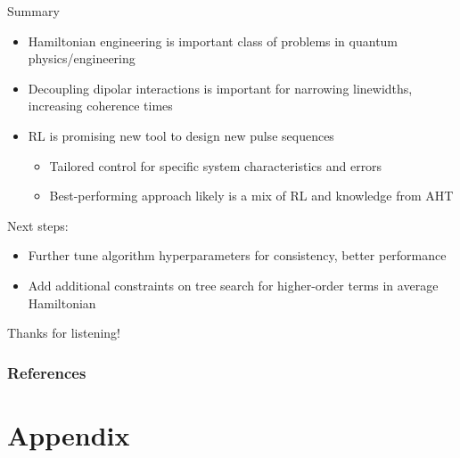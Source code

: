 \documentclass{beamer}
\begin{document}
\begin{frame}{Summary}

\begin{itemize}
    \item Hamiltonian engineering is important class of problems in quantum physics/engineering
    \item Decoupling dipolar interactions is important for narrowing linewidths, increasing coherence times
    \item RL is promising new tool to design new pulse sequences
    \begin{itemize}
        \item Tailored control for specific system characteristics and errors
        \item Best-performing approach likely is a mix of RL and knowledge from AHT
    \end{itemize}
\end{itemize}

\pause

Next steps:
\begin{itemize}
    \item Further tune algorithm hyperparameters for consistency, better performance
    \item Add additional constraints on tree search for higher-order terms in average Hamiltonian
\end{itemize}

\pause

\begin{center}
    Thanks for listening!
\end{center}

\end{frame}



\begin{frame}[allowframebreaks]
\frametitle{References}

\printbibliography

\end{frame}
















\section{Appendix}
\end{document}
